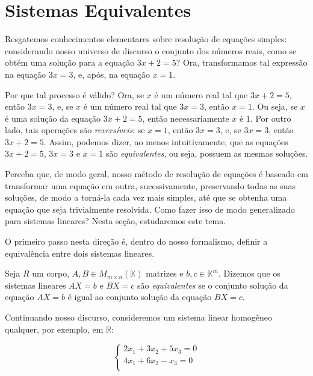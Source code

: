 
\section{Sistemas Equivalentes}
Resgatemos conhecimentos elementares sobre resolução de equações simples: considerando nosso universo de discurso o conjunto dos números reais, como se obtém uma solução para a equação $3x+2=5$?
Ora, transformamos tal expressão na equação $3x=3$, e, após, na equação $x=1$.

Por que tal processo é válido?
Ora, se $x$ é um número real tal que $3x+2=5$, então $3x=3$, e, se $x$ é um número real tal que $3x=3$, então $x=1$.
Ou seja, se $x$ é uma solução da equação $3x+2=5$, então necessariamente $x$ é $1$.
Por outro lado, tais operações são \emph{reversíveis}: se $x=1$, então $3x=3$, e, se $3x=3$, então $3x+2=5$.
Assim, podemos dizer, ao menos intuitivamente, que as equações $3x+2=5$, $3x=3$ e $x=1$ são \emph{equivalentes}, ou seja, possuem as mesmas soluções.

Perceba que, de modo geral, nosso método de resolução de equações é baseado em transformar uma equação em outra, sucessivamente, preservando todas as suas soluções, de modo a torná-la cada vez mais simples, até que se obtenha uma equação que seja trivialmente resolvida.
Como fazer isso de modo generalizado para sistemas lineares?
Nesta seção, estudaremos este tema.

O primeiro passo nesta direção é, dentro do nosso formalismo, definir a equivalência entre dois sistemas lineares.

\begin{definition}
    Seja $R$ um corpo, $A, B\in M_{m \times n}(\mathbb K)$ matrizes e $b, c \in \mathbb K^m$.
    Dizemos que os sistemas lineares $AX=b$ e $BX=c$ são \emph{equivalentes} se o conjunto solução da equação $AX=b$ é igual ao conjunto solução da equação $BX=c$.
\end{definition}

Continuando nosso discurso, consideremos um sistema linear homogêneo qualquer, por exemplo, em $\mathbb R$:

\begin{equation}\label{eq:exemploSistema}
    \begin{cases}
        2x_1 + 3x_2 + 5x_3 = 0 \\
        4x_1 + 6x_2 - x_3 = 0 \\
    \end{cases}
\end{equation}

